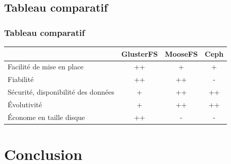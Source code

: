 \documentclass[blue]{beamer}
\begin{document}
	\subsection{Tableau comparatif}
		\begin{frame}
		\frametitle{Tableau comparatif}
			\begin{tabular}{|l|c|c|c|}
				\hline
				& \bf{GlusterFS} & \bf{MooseFS} & \bf{Ceph}\\
				\hline
				Facilité de mise en place & ++ & + & +\\
				\hline
				Fiabilité & ++ & ++ & -\\
				\hline
				Sécurité, disponibilité des données & + & ++ & ++ \\
				\hline
				Évolutivité & + & ++  & ++\\
				\hline
				Économe en taille disque & ++ & - & - \\
				\hline
			\end{tabular}
		\end{frame}

\section{Conclusion}
\begin{frame}

\end{frame}
\end{document}
